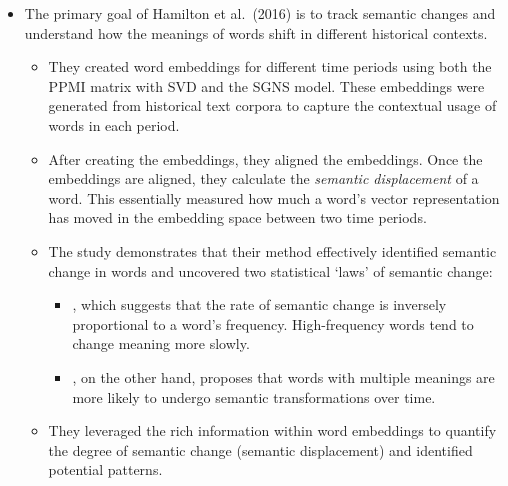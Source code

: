 \begin{itemize}
    \item {}
    The primary goal of Hamilton et al.\ (2016) is to track semantic changes and understand how the meanings of words shift in different historical contexts.
    \begin{itemize}
        \item They created word embeddings for different time periods using both the PPMI matrix with SVD and the SGNS model.
        These embeddings were generated from historical text corpora to capture the contextual usage of words in each period.
        \item After creating the embeddings, they aligned the embeddings.
        Once the embeddings are aligned, they calculate the \emph{semantic displacement} of a word.
        This essentially measured how much a word's vector representation has moved in the embedding space between two time periods.
        \item The study demonstrates that their method effectively identified semantic change in words and uncovered two statistical `laws' of semantic change:
        \begin{itemize}
            \item {}, which suggests that the rate of semantic change is inversely proportional to a word's frequency.
            High-frequency words tend to change meaning more slowly.
            \item {}, on the other hand, proposes that words with multiple meanings are more likely to undergo semantic transformations over time.
        \end{itemize}
        \item They leveraged the rich information within word embeddings to quantify the degree of semantic change (semantic displacement) and identified potential patterns.
    \end{itemize}


\end{itemize}

